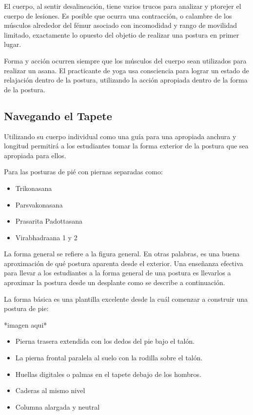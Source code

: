 El cuerpo, al sentir desalineación, tiene varios trucos para analizar y ptorejer el cuerpo de lesiones. Es posible que ocurra una contracción, o calambre de los músculos alrededor del fémur asociado con incomodidad y rango de movilidad limitado, exactamente lo opuesto del objetio de realizar una postura en primer lugar.

Forma y acción ocurren siempre que los músculos del cuerpo sean utilizados para realizar un asana. El practicante de yoga usa consciencia para lograr un estado de relajación dentro de la postura, utilizando la acción apropiada dentro de la forma de la postura.

\subsection{Navegando el Tapete}
Utilizando su cuerpo individual como una guía para una apropiada anchura y longitud permitirá a los estudiantes tomar la forma exterior de la postura que sea apropiada para ellos.

Para las posturas de pié con piernas separadas como:

\begin{itemize}
	\item Trikonasana
	\item Parsvakonasana
	\item Prasarita Padottasana
	\item Virabhadraana 1 y 2
\end{itemize}

La forma general se refiere a la figura general. En otras palabras, es una buena aproximación de qué postura aparenta desde el exterior. Una enseñanza efectiva para llevar a los estudiantes a la forma general de una postura es llevarlos a aproximar la postura desde un desplante como se describe a continuación.

La forma básica es una plantilla excelente desde la cuál comenzar a construir una postura de pie:

*imagen aqui*
\begin{itemize}
	\item Pierna trasera extendida con los dedos del pie bajo el talón.
	\item La pierna frontal paralela al suelo con la rodilla sobre el talón.
	\item Huellas digitales o palmas en el tapete debajo de los hombros.
	\item Caderas al mismo nivel
	\item Columna alargada y neutral
\end{itemize}


